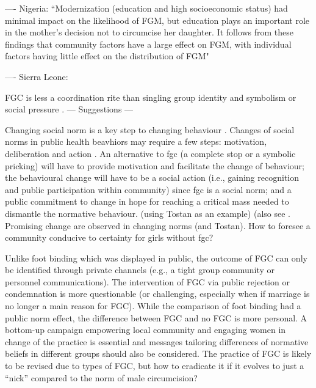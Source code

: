 \documentclass[12pt,]{article}
\begin{document}
---- Nigeria: ``Modernization (education and high socioeconomic status) had minimal impact on the likelihood of FGM, but education plays an important role in the mother's decision not to circumcise her daughter. It follows from these findings that community factors have a large effect on FGM, with individual factors having little effect on the distribution of FGM" \cite{KandNwak09}

---- Sierra Leone: 
\cite{Sagn14}  


FGC is less a coordination rite than singling group identity and symbolism \cite{ShelWand11, Youn15} or social pressure \cite{}.
— Suggestions —

Changing social norm is a key step to changing behaviour  .  Changes of social norms in public health beavhiors may require a few steps:  motivation, deliberation and action \cite{CislHeis18a}.  An alternative to fgc (a complete stop or a symbolic pricking) will have to provide motivation and facilitate the change of behaviour; the behavioural change will have to be a social action (i.e., gaining recognition and public participation within community) since fgc is a social norm;  and a public commitment to change in hope for reaching a critical mass needed to dismantle the normative behaviour. (using Tostan as an example) (also see \cite{Youn15}.  Promising change are observed in changing norms \cite{EvanSnid19} (and Tostan).  How to foresee a community conducive to certainty for girls without fgc?

Unlike foot binding which was displayed in public, the outcome of FGC can only be identified through private channels (e.g., a tight group community or personnel communications).  The intervention of FGC via public rejection or condemnation is more questionable (or challenging, especially when if marriage is no longer a main reason for FGC).  While the comparison of foot binding had a public norm effect, the difference between FGC and no FGC is more personal.  A bottom-up campaign empowering local community and engaging women in change of the practice is essential \cite{BergDeni13b} and messages tailoring differences of normative beliefs in different groups should also be considered.  The practice of FGC is likely to be revised due to types of FGC, but how to eradicate it if it evolves to just a “nick” compared to the norm of male circumcision?
\end{document}
